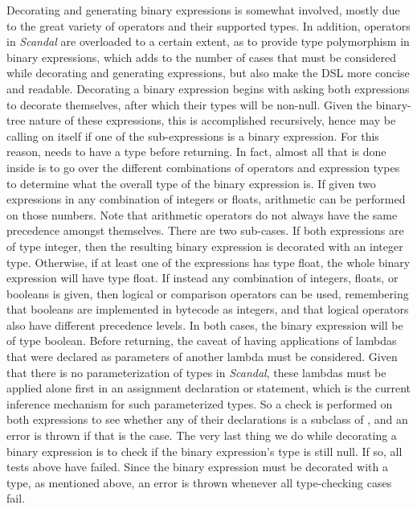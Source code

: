 Decorating and generating binary expressions is somewhat involved, mostly due to the great variety of operators and their supported types. In addition, operators in \emph{Scandal} are overloaded to a certain extent, as to provide type polymorphism in binary expressions, which adds to the number of cases that must be considered while decorating and generating expressions, but also make the DSL more concise and readable. Decorating a binary expression begins with asking both expressions to decorate themselves, after which their types will be non-null. Given the binary-tree nature of these expressions, this is accomplished recursively, hence  may be calling on itself if one of the sub-expressions is a binary expression. For this reason,  needs to have a type before returning. In fact, almost all that is done inside  is to go over the different combinations of operators and expression types to determine what the overall type of the binary expression is. If given two expressions in any combination of integers or floats, arithmetic can be performed on those numbers. Note that arithmetic operators do not always have the same precedence amongst themselves. There are two sub-cases. If both expressions are of type integer, then the resulting binary expression is decorated with an integer type. Otherwise, if at least one of the expressions has type float, the whole binary expression will have type float. If instead any combination of integers, floats, or booleans is given, then logical or comparison operators can be used, remembering that booleans are implemented in bytecode as integers, and that logical operators also have different precedence levels. In both cases, the binary expression will be of type boolean. Before returning, the caveat of having applications of lambdas that were declared as parameters of another lambda must be considered. Given that there is no parameterization of types in \emph{Scandal}, these lambdas must be applied alone first in an assignment declaration or statement, which is the current inference mechanism for such parameterized types. So a check is performed on both expressions to see whether any of their declarations is a subclass of , and an error is thrown if that is the case. The very last thing we do while decorating a binary expression is to check if the binary expression's type is still null. If so, all tests above have failed. Since the binary expression must be decorated with a type, as mentioned above, an error is thrown whenever all type-checking cases fail.

